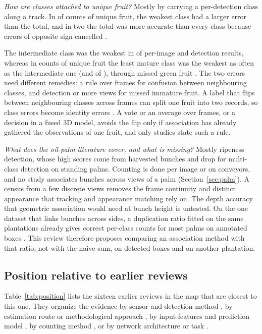 \textit{How are classes attached to unique fruit?} Mostly by carrying a per-detection class along a track. In \nKelasLebih of \nKelasBanding counts of unique fruit, the weakest class had a larger error than the total, and in two the total was more accurate than every class because errors of opposite sign cancelled \citep{ogundele2025real,wang2025tomato}.

The intermediate class was the weakest in \nKelasLainTengah of \nKelasLain per-image and detection results, whereas in counts of unique fruit the least mature class was the weakest as often as the intermediate one (\nKelasUnikMentah and \nKelasUnikTengah of \nKelasUnik), through missed green fruit \citep{wu2025maturity,tenorio2021automatic}. The two errors need different remedies: a rule over frames for confusion between neighbouring classes, and detection or more views for missed immature fruit. A label that flips between neighbouring classes across frames can split one fruit into two records, so class errors become identity errors \citep{wang2025tomato}. A vote or an average over frames, or a decision in a fused 3D model, avoids the flip only if association has already gathered the observations of one fruit, and only \nClassVote studies state such a rule.

\textit{What does the oil-palm literature cover, and what is missing?} Mostly ripeness detection, whose high scores come from harvested bunches and drop for multi-class detection on standing palms. Counting is done per image or on conveyors, and no study associates bunches across views of a palm (Section~\ref{sec:palm}). A census from a few discrete views removes the frame continuity and distinct appearance that tracking and appearance matching rely on. The depth accuracy that geometric association would need at bunch height is untested. On the one dataset that links bunches across sides, a duplication ratio fitted on the same plantations already gives correct per-class counts for most palms on annotated boxes \citep{indriani2026sawitmvc}. This review therefore proposes comparing an association method with that ratio, not with the naive sum, on detected boxes and on another plantation.

\subsection{Position relative to earlier reviews}\label{sec:position}
Table~\ref{tab:position} lists the sixteen earlier reviews in the map that are closest to this one. They organize the evidence by sensor and detection method \citep{gongal2015sensors}, by estimation route or methodological approach \citep{anderson2021technologies,barriguinha2021vineyard,he2022fruit,magro2023computational,rong2026research}, by input features and prediction model \citep{liu2026shaping}, by counting method \citep{huang2023survey}, or by network architecture or task \citep{koirala2019deepb,maheswari2021intelligent,mohimont2022computer,miranda2023fruit}.

